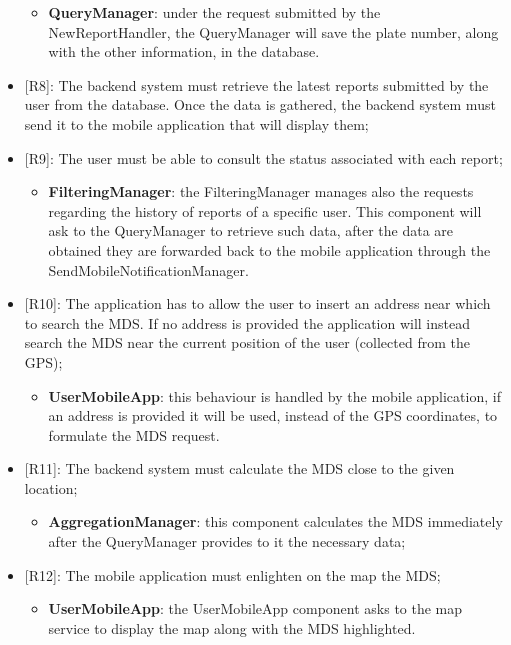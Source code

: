 \begin{itemize}
    \begin{itemize}
      \item \textbf{QueryManager}: under the request submitted by the NewReportHandler, the QueryManager will save the plate number, along with the other information, in the database. 
    \end{itemize} 
    \item {[R8]}: The backend system must retrieve the latest reports submitted by the user from the database. Once the data is gathered, the backend system must send it to the mobile application that will display them; 
    \item[] {[R9]}: The user must be able to consult the status associated with each report;
    \begin{itemize}
      \item \textbf{FilteringManager}: the FilteringManager manages also the requests regarding the history of reports of a specific user. This component will ask to the QueryManager to retrieve such data, after the data are obtained they are forwarded back to the mobile application through the SendMobileNotificationManager.
    \end{itemize}
    \item {[R10]}: The application has to allow the user to insert an address near which to search the MDS. If no address is provided the application will instead search the MDS near the current position of the user (collected from the GPS);
    \begin{itemize}
      \item \textbf{UserMobileApp}: this behaviour is handled by the mobile application, if an address is provided it will be used, instead of the GPS coordinates, to formulate the MDS request.  
    \end{itemize} 
    \item {[R11]}: The backend system must calculate the MDS close to the given location;
    \begin{itemize}
      \item \textbf{AggregationManager}: this component calculates the MDS immediately after the QueryManager provides to it the necessary data; 
    \end{itemize} 
    \item {[R12]}: The mobile application must enlighten on the map the MDS;
    \begin{itemize}
      \item \textbf{UserMobileApp}: the UserMobileApp component asks to the map service to display the map along with the MDS highlighted.

\end{itemize}
\end{itemize}
